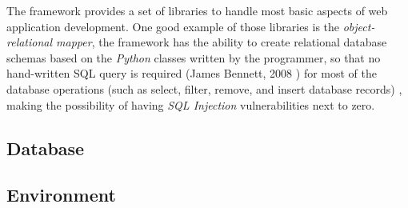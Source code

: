 The framework provides a set of libraries to handle most basic aspects of web
application development. One good example of those libraries is the
\emph{object-relational mapper}, the framework has the ability to create
relational database schemas based on the \emph{Python} classes written by the
programmer, so that no hand-written SQL query is required
(James Bennett, 2008 \cite{django}) for most of the
database operations (such as select, filter, remove, and insert database
records)
, making the possibility of having \emph{SQL Injection} vulnerabilities next
to zero.

\medskip


\subsection{Database}
\subsection{Environment}